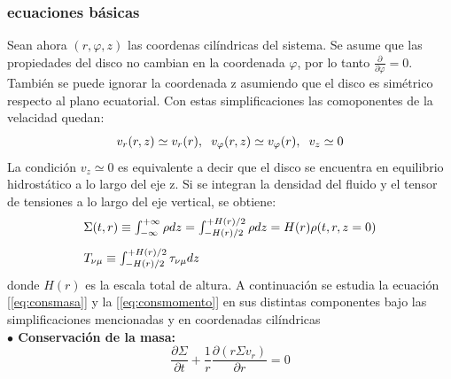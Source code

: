 \documentclass{beamer}
\begin{document}
\begin{frame}
\frametitle{ecuaciones básicas}
\justify
\scriptsize
\vspace*{-0.2cm}
Sean ahora $(r,\varphi,z)$ las coordenas cilíndricas del sistema. Se asume que las propiedades del disco
no cambian en la coordenada $\varphi$, por lo tanto $\frac{\partial}{\partial \varphi}=0 $. También se puede
ignorar la coordenada z asumiendo que el disco es simétrico respecto al plano ecuatorial. Con estas
simplificaciones las comoponentes de la velacidad quedan:
\begin{equation*}
 v_{r}(r,z) \simeq v_{r}(r),  \hspace*{0.2cm}
 v_{\varphi}(r,z) \simeq v_{\varphi}(r), \hspace*{0.2cm}
 v_{z}\simeq 0
\end{equation*}
La condición  $v_{z}\simeq 0$ es equivalente a decir que el disco
se encuentra en equilibrio hidrostático a lo largo del eje z.
Si se integran la densidad del fluido y el tensor de tensiones a lo largo del eje vertical,
se obtiene:
\begin{equation*}
\begin{array}{l}
\vspace*{0.3cm}
 \Sigma(t,r) \equiv \int_{-\infty}^{+\infty} \rho dz =  \int_{-H(r)/2}^{+H(r)/2} \rho dz = H(r)\rho(t,r,z=0)\\
 T_{\nu\mu} \equiv \int_{-H(r)/2}^{+H(r)/2} \tau_{\nu\mu} dz 
\end{array}
\end{equation*}
donde $H(r)$ es la escala total de altura.
A continuación se estudia la ecuación [\ref{eq:consmasa}] y la [\ref{eq:consmomento}] en sus distintas componentes
bajo las simplificaciones mencionadas y en coordenadas cilíndricas\\
\textbf{$\bullet$ Conservación de la masa:}
\begin{equation}\label{eq:consmasacili}
 \frac{\partial \Sigma}{\partial t} + \frac{1}{r} \frac{\partial (r\Sigma v_{r})}{\partial r}=0 
\end{equation}
\end{frame}
\end{document}
